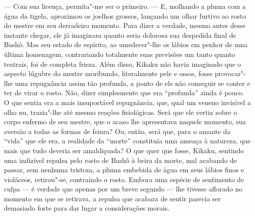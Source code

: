 --- Com sua licença, permita"-me ser o primeiro. --- E, molhando a pluma com
a água da tigela, aproximou os joelhos grossos, lançando um olhar
furtivo ao rosto do mestre em seu derradeiro momento. Para dizer a
verdade, mesmo antes desse instante 
chegar, ele já imaginara quanto seria dolorosa sua despedida final de
Bashô. Mas seu estado de espírito, ao umedecer"-lhe os lábios em penhor
de uma última homenagem, contrariando totalmente suas previsões um
tanto quanto teatrais, foi de completa frieza. Além disso, Kikaku não
havia imaginado que o aspecto lúgubre do mestre moribundo, literalmente
pele e ossos, fosse provocar"-lhe uma repugnância assim tão profunda, a
ponto de ele não conseguir se conter e ter de virar o rosto. Não, dizer
simplesmente que era ``profunda'' ainda é pouco. O que sentia era a mais
insuportável repugnância, que, qual um veneno invisível a olho nu,
trazia"-lhe até mesmo reações fisiológicas. Será que ele vertia sobre o
corpo enfermo de seu mestre, que o acaso lhe apresentava naquele
momento, sua aversão a todas as formas de feiura? Ou, então, será que,
para o amante da ``vida'' que ele era, a realidade da ``morte'' constituía
uma ameaça à natureza, que mais que tudo deveria ser amaldiçoada? O que
quer que fosse, Kikaku, sentindo uma indizível repulsa pelo rosto de
Bashô à beira da morte, mal acabando de passar, sem nenhuma tristeza, a
pluma embebida de água em seus lábios finos e violáceos, retirou"-se,
contraindo o rosto. Embora uma espécie de sentimento de culpa --- é
verdade que apenas por um breve segundo --- lhe tivesse aflorado no
momento em que se retirava, a repulsa que acabara de sentir parecia ser
demasiado forte para dar lugar a considerações morais.

